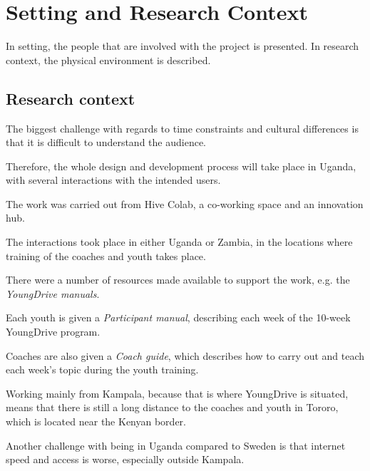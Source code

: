 \section{Setting and Research Context}

In setting, the people that are involved with the project is presented. In research context, the physical environment is described.



\subsection{Research context} 

The biggest challenge with regards to time constraints and cultural differences is that it is difficult to understand the audience.

Therefore, the whole design and development process will take place in Uganda, with several interactions with the intended users.

The work was carried out from Hive Colab, a co-working space and an innovation hub.

The interactions took place in either Uganda or Zambia, in the locations where training of the coaches and youth takes place.

There were a number of resources made available to support the work, e.g. the \textit{YoungDrive manuals}.

Each youth is given a \textit{Participant manual}, describing each week of the 10-week YoungDrive program.

Coaches are also given a \textit{Coach guide}, which describes how to carry out and teach each week's topic during the youth training.

Working mainly from Kampala, because that is where YoungDrive is situated, means that there is still a long distance to the coaches and youth in Tororo, which is located near the Kenyan border.

Another challenge with being in Uganda compared to Sweden is that internet speed and access is worse, especially outside Kampala.
